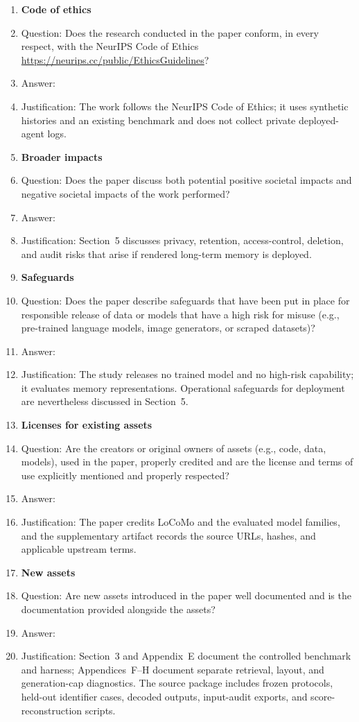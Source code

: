 \begin{enumerate}
\item {\bf Code of ethics}
    \item[] Question: Does the research conducted in the paper conform, in every respect, with the NeurIPS Code of Ethics \url{https://neurips.cc/public/EthicsGuidelines}?
    \item[] Answer: \answerYes{}
    \item[] Justification: The work follows the NeurIPS Code of Ethics; it uses synthetic histories and an existing benchmark and does not collect private deployed-agent logs.

\item {\bf Broader impacts}
    \item[] Question: Does the paper discuss both potential positive societal impacts and negative societal impacts of the work performed?
    \item[] Answer: \answerYes{}
    \item[] Justification: Section~5 discusses privacy, retention, access-control, deletion, and audit risks that arise if rendered long-term memory is deployed.
    
\item {\bf Safeguards}
    \item[] Question: Does the paper describe safeguards that have been put in place for responsible release of data or models that have a high risk for misuse (e.g., pre-trained language models, image generators, or scraped datasets)?
    \item[] Answer: \answerNA{}
    \item[] Justification: The study releases no trained model and no high-risk capability; it evaluates memory representations. Operational safeguards for deployment are nevertheless discussed in Section~5.

\item {\bf Licenses for existing assets}
    \item[] Question: Are the creators or original owners of assets (e.g., code, data, models), used in the paper, properly credited and are the license and terms of use explicitly mentioned and properly respected?
    \item[] Answer: \answerYes{}
    \item[] Justification: The paper credits LoCoMo and the evaluated model families, and the supplementary artifact records the source URLs, hashes, and applicable upstream terms.

\item {\bf New assets}
    \item[] Question: Are new assets introduced in the paper well documented and is the documentation provided alongside the assets?
    \item[] Answer: \answerYes{}
    \item[] Justification: Section~3 and Appendix~E document the controlled benchmark and harness; Appendices~F--H document separate retrieval, layout, and generation-cap diagnostics. The source package includes frozen protocols, held-out identifier cases, decoded outputs, input-audit exports, and score-reconstruction scripts.


\end{enumerate}
